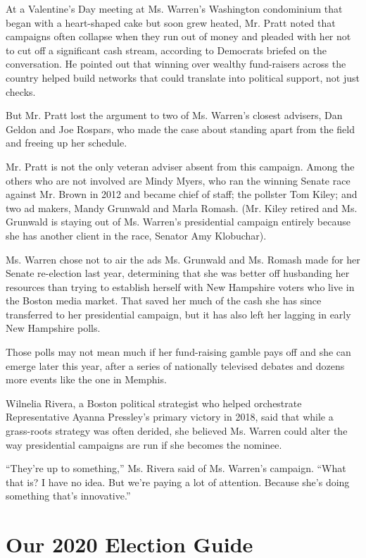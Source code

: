 At a Valentine's Day meeting at Ms. Warren's Washington condominium that
began with a heart-shaped cake but soon grew heated, Mr. Pratt noted
that campaigns often collapse when they run out of money and pleaded
with her not to cut off a significant cash stream, according to
Democrats briefed on the conversation. He pointed out that winning over
wealthy fund-raisers across the country helped build networks that could
translate into political support, not just checks.

But Mr. Pratt lost the argument to two of Ms. Warren's closest advisers,
Dan Geldon and Joe Rospars, who made the case about standing apart from
the field and freeing up her schedule.

Mr. Pratt is not the only veteran adviser absent from this campaign.
Among the others who are not involved are Mindy Myers, who ran the
winning Senate race against Mr. Brown in 2012 and became chief of staff;
the pollster Tom Kiley; and two ad makers, Mandy Grunwald and Marla
Romash. (Mr. Kiley retired and Ms. Grunwald is staying out of Ms.
Warren's presidential campaign entirely because she has another client
in the race, Senator Amy Klobuchar).

Ms. Warren chose not to air the ads Ms. Grunwald and Ms. Romash made for
her Senate re-election last year, determining that she was better off
husbanding her resources than trying to establish herself with New
Hampshire voters who live in the Boston media market. That saved her
much of the cash she has since transferred to her presidential campaign,
but it has also left her lagging in early New Hampshire polls.

Those polls may not mean much if her fund-raising gamble pays off and
she can emerge later this year, after a series of nationally televised
debates and dozens more events like the one in Memphis.

Wilnelia Rivera, a Boston political strategist who helped orchestrate
Representative Ayanna Pressley's primary victory in 2018, said that
while a grass-roots strategy was often derided, she believed Ms. Warren
could alter the way presidential campaigns are run if she becomes the
nominee.

``They're up to something,'' Ms. Rivera said of Ms. Warren's campaign.
``What that is? I have no idea. But we're paying a lot of attention.
Because she's doing something that's innovative.''

\hypertarget{our-2020-election-guide}{%
\section{Our 2020 Election Guide}\label{our-2020-election-guide}}


